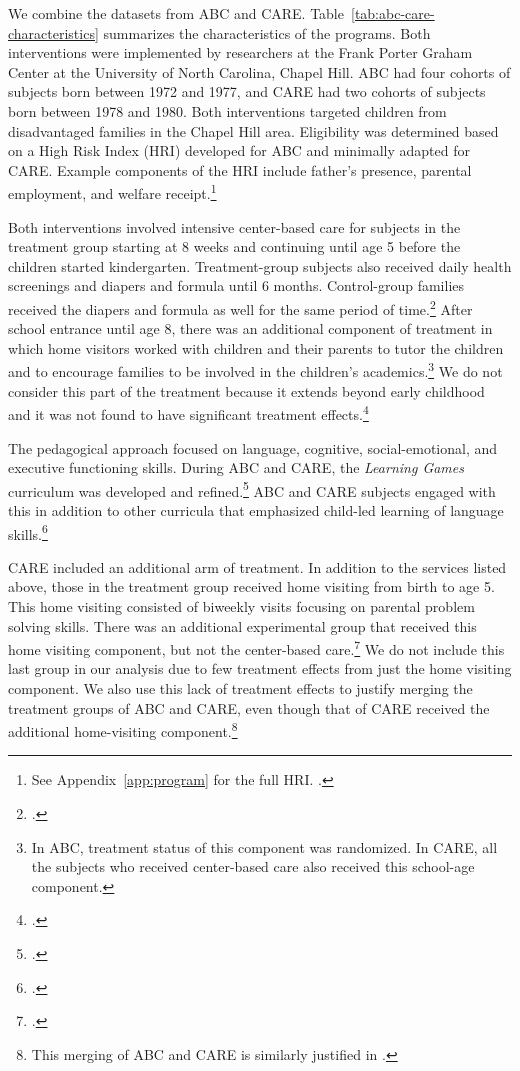 We combine the datasets from ABC and CARE. Table~\ref{tab:abc-care-characteristics} summarizes the characteristics of the programs. Both interventions were implemented by researchers at the Frank Porter Graham Center at the University of North Carolina, Chapel Hill. ABC had four cohorts of subjects born between 1972 and 1977, and CARE had two cohorts of subjects born between 1978 and 1980. Both interventions targeted children from disadvantaged families in the Chapel Hill area. Eligibility was determined based on a High Risk Index (HRI) developed for ABC and minimally adapted for CARE. Example components of the HRI include father's presence, parental employment, and welfare receipt.\footnote{See Appendix~\ref{app:program} for the full HRI. \citet{Ramey_Smith_1977_AJMD, Wasik_Ramey_etal_1990_CD, Ramey_Campbell_1991_childreninpoverty}.}

Both interventions involved intensive center-based care for subjects in the treatment group starting at 8 weeks and continuing until age 5 before the children started kindergarten. Treatment-group subjects also received daily health screenings and diapers and formula until 6 months. Control-group families received the diapers and formula as well for the same period of time.\footnote{\citet{Wasik_Ramey_etal_1990_CD}.}  After school entrance until age 8, there was an additional component of treatment in which home visitors worked with children and their parents to tutor the children and to encourage families to be involved in the children's academics.\footnote{In ABC, treatment status of this component was randomized. In CARE, all the subjects who received center-based care also received this school-age component.} We do not consider this part of the treatment because it extends beyond early childhood and it was not found to have significant treatment effects.\footnote{\citet{Campbell_Ramey_etal_2002_ADS}.} 

The pedagogical approach focused on language, cognitive, social-emotional, and executive functioning skills. During ABC and CARE, the \textit{Learning Games} curriculum was developed and refined.\footnote{\citet{Sparling_Lewis_1979_BOOKLearninggamesFirstThree}.} ABC and CARE subjects engaged with this in addition to other curricula that emphasized child-led learning of language skills.\footnote{\citet{Conti_etal_2016_LongTermHealth}.}

CARE included an additional arm of treatment. In addition to the services listed above, those in the treatment group received home visiting from birth to age 5. This home visiting consisted of biweekly visits focusing on parental problem solving skills. There was an additional experimental group that received this home visiting component, but not the center-based care.\footnote{\citet{Wasik_Ramey_etal_1990_CD}.} We do not include this last group in our analysis due to few treatment effects from just the home visiting component. We also use this lack of treatment effects to justify merging the treatment groups of ABC and CARE, even though that of CARE received the additional home-visiting component.\footnote{This merging of ABC and CARE is similarly justified in \citet{Garcia_etal_2016_Comp_CBA_Unpublished}.}

